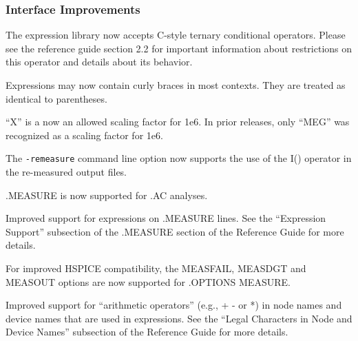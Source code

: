 \documentclass[letterpaper]{scrartcl}
\begin{document}
\subsubsection*{Interface Improvements}
\begin{XyceItemize}
\item The \Xyce{} expression library now accepts C-style ternary
  conditional operators.  Please see the reference guide section 2.2
  for important information about restrictions on this operator and
  details about its behavior.
\item Expressions may now contain curly braces in most contexts.  They
  are treated as identical to parentheses.
\item ``X'' is a now an allowed scaling factor for 1e6.  In prior \Xyce{}
  releases, only ``MEG'' was recognized as a scaling factor for 1e6.
\item The \texttt{-remeasure} command line option now supports the use 
of the I() operator in the re-measured output files.
\item .MEASURE is now supported for .AC analyses.
\item Improved support for expressions on .MEASURE lines.  See the ``Expression
Support'' subsection of the .MEASURE section of the \Xyce{} Reference Guide 
for more details.
\item For improved HSPICE compatibility, the MEASFAIL, MEASDGT and MEASOUT
options are now supported for .OPTIONS MEASURE.
\item Improved support for ``arithmetic operators'' (e.g., + - or *) in node names
and device names that are used in expressions. See the ``Legal Characters in Node
and Device Names'' subsection of the \Xyce{} Reference Guide for more details.
\end{XyceItemize}
\end{document}
